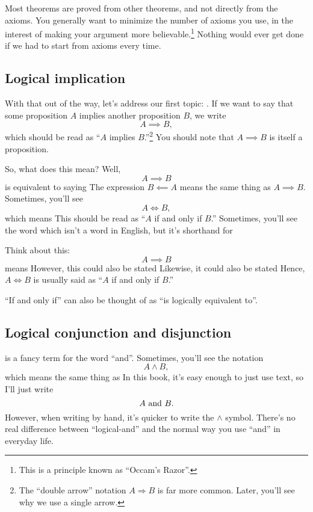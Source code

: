 Most theorems are proved from other theorems, and not directly from
the axioms. You generally want to minimize the number of axioms you
use, in the interest of making your argument more
believable.\footnote{This is a principle known as ``Occam's Razor''.}
Nothing would ever get done if we had to start from axioms every time.

\subsection{Logical implication}

With that out of the way, let's address our first topic:
. If we want to say that some proposition $A$
implies another proposition $B$, we write $$A \implies B,$$ which
should be read as ``$A$ implies $B$.''\footnote{The ``double arrow''
  notation $A \Rightarrow B$ is far more common. Later, you'll see why
  we use a single arrow.}  You should note that $A \implies B$ is
itself a proposition.

So, what does this mean? Well, $$A \implies B$$ is equivalent to
saying  The expression $B \impliedby A$ means
the same thing as $A \implies B.$ Sometimes, you'll see $$A \iff B,$$
which means  This
should be read as ``$A$ if and only if $B$.'' Sometimes, you'll see
the word  which isn't a word in English, but it's
shorthand for 

Think about this: $$A \implies B$$ means 
However, this could also be stated  Likewise, it
could also be stated  Hence, $A \iff B$ is
usually said as ``$A$ if and only if $B$.''

``If and only if'' can also be thought of as ``is logically equivalent
to''.

\subsection{Logical conjunction and disjunction}

 is a fancy term for the word
``and''. Sometimes, you'll see the notation $$A \land B,$$ which means
the same thing as  In this book, it's easy
enough to just use text, so I'll just write $$A \text{ and } B.$$ However,
when writing by hand, it's quicker to write the $\land$
symbol. There's no real difference between ``logical-and'' and the
normal way you use ``and'' in everyday life.

